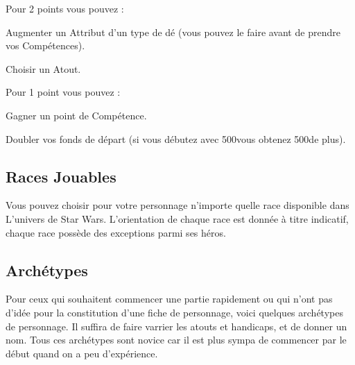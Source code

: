 Pour 2 points vous pouvez :
\begin{rebelist}
    \item Augmenter un Attribut d’un type de dé (vous pouvez le faire avant de prendre vos Compétences).
    \item Choisir un Atout.
\end{rebelist}

Pour 1 point vous pouvez :
\begin{rebelist}
    \item Gagner un point de Compétence.
    \item Doubler vos fonds de départ (si vous débutez avec 500\crg vous obtenez 500\crg de plus).
\end{rebelist}

\subsection{Races Jouables}
Vous pouvez choisir pour votre personnage n’importe quelle race disponible dans L’univers de Star Wars. L’orientation de chaque race est donnée à titre indicatif, chaque race possède des exceptions parmi ses héros.















%
%

\clearpage


\clearpage


\clearpage


\newpage


\clearpage
\subsection{Archétypes}

Pour ceux qui souhaitent commencer une partie rapidement ou qui n’ont pas d’idée pour la constitution d’une fiche de personnage, voici quelques archétypes de personnage. Il suffira de faire varrier les atouts et handicaps, et de donner un nom. Tous ces archétypes sont novice car il est plus sympa de commencer par le début quand on a peu d’expérience.


\clearpage 

